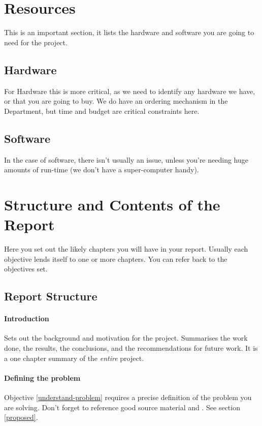 \section{Resources}
This is an important section, it lists the hardware and software you are going to need for the project.

\subsection{Hardware}
For Hardware this is more critical, as we need to identify any hardware we have, or that you are going to buy.  We do have an ordering mechanism in the Department, but time and budget are critical constraints here.

\subsection{Software}
In the case of software, there isn't usually an issue, unless you're needing huge amounts of run-time (we don't have a super-computer handy).

\section{Structure and Contents of the Report}
Here you set out the likely chapters you will have in your report.  Usually each objective lends itself to one or more chapters.  You can refer back to the objectives set.
\subsection{Report Structure}

\paragraph{Introduction}  Sets out the background and motivation for the project.  Summarises the work done, the results, the conclusions, and the recommendations for future work.  It is a one chapter summary of the \emph{entire} project.

\paragraph{Defining the problem}  Objective \ref{understand-problem} requires a precise definition of the problem you are solving.  Don't forget to reference good source material \citep{henning_schulzrinne} and \citep{talbot2013}.  See section \ref{proposed}.

